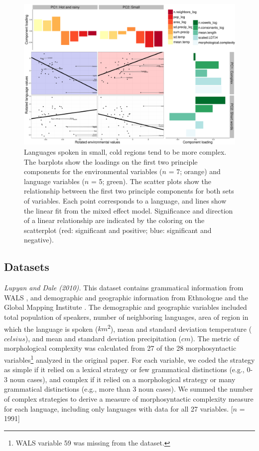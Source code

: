 \documentclass[10pt,letterpaper]{article}
\begin{document}
\begin{figure}[t]
\begin{center}
\includegraphics[scale = .35]{figs/plot2.pdf}
\end{center}
\vspace{-.5em}
\caption{Languages spoken in small, cold regions tend to be more complex. The barplots show the loadings on the first two principle components for the environmental variables ($n$ = 7; orange) and language variables ($n$ = 5; green). The scatter plots show the relationship between the first two principle components for both sets of variables. Each point corresponds to a language, and lines show the linear fit from the mixed effect model. Significance and direction of a linear relationship are indicated by the coloring on the scatterplot (red: significant  and positive; blue: significant and negative).}
\label{fig:cbias}
\vspace{-1em}
\end{figure}

\subsection{Datasets}
{\it Lupyan and Dale (2010).} This dataset contains grammatical information from WALS \cite{wals}, and demographic and geographic information from Ethnologue and the Global Mapping Institute \cite{gordon2005,gmi}. The demographic and geographic variables included total population of speakers, number of neighboring languages, area of region in which the language is spoken ($km$\textsuperscript{2}), mean and standard deviation temperature ($celsius$), and mean and standard deviation precipitation ($cm$). The metric of morphological complexity was calculated from  27 of the 28 morphosyntactic variables\footnote{WALS variable 59 was missing from the dataset.} analyzed in the original paper. For each variable, we coded the strategy as simple if it relied on a lexical strategy or few grammatical distinctions (e.g.,  0-3 noun cases), and complex if it relied on a morphological strategy or many grammatical distinctions (e.g.,  more than 3 noun cases). We summed the number of complex strategies to derive a measure of morphosyntactic complexity measure for each language, including only languages with data for all 27 variables. [$n$ = 1991] 
\end{document}
